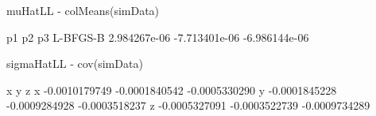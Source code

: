 \begin{Schunk}
\begin{Sinput}
 muHatLL - colMeans(simData)
\end{Sinput}
\begin{Soutput}
                   p1            p2            p3
L-BFGS-B 2.984267e-06 -7.713401e-06 -6.986144e-06
\end{Soutput}
\begin{Sinput}
 sigmaHatLL - cov(simData)
\end{Sinput}
\begin{Soutput}
              x             y             z
x -0.0010179749 -0.0001840542 -0.0005330290
y -0.0001845228 -0.0009284928 -0.0003518237
z -0.0005327091 -0.0003522739 -0.0009734289
\end{Soutput}
\end{Schunk}
